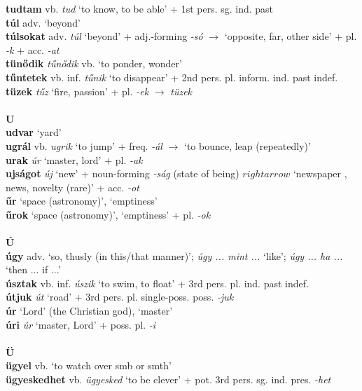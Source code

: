 \documentclass[11pt]{article}
\begin{document}
\textbf{tudtam} vb. \emph{tud} `to know, to be able' + 1st
pers. sg. ind. past \\
\textbf{túl} adv. `beyond' \\
\textbf{túlsokat} adv. \emph{túl} `beyond' + adj.\hyp{}forming \emph{-só}
$\rightarrow$ `opposite, far, other side' + pl. \emph{-k} + acc. \emph{-at} \\
\textbf{tünődik} \emph{tűnődik} vb. `to ponder, wonder' \\
\textbf{tűntetek} vb. inf. \emph{tűnik} `to disappear' + 2nd
pers. pl. inform. ind. past indef. \\
\textbf{tüzek} \emph{tűz} `fire, passion' + pl. \emph{-ek}
$\rightarrow$ \emph{tüzek} \\
\ \\
\noindent \textbf{\large U} \\
\textbf{udvar} `yard' \\
\textbf{ugrál} vb. \emph{ugrik} `to jump' + freq. \emph{-ál}
$\rightarrow$ `to bounce, leap (repeatedly)' \\
\textbf{urak} \emph{úr} `master, lord' + pl. \emph{-ak} \\
\textbf{ujságot} \emph{új} `new' + noun\hyp{}forming \emph{-ság}
(state of being)
$rightarrow$ `newspaper , news, novelty (rare)' + acc. \emph{-ot} \\
\textbf{űr} `space (astronomy)', `emptiness' \\
\textbf{űrok} `space (astronomy)', `emptiness' + pl. \emph{-ok} \\
\ \\
\noindent \textbf{\large Ú} \\
\textbf{úgy} adv. `so, thusly (in this/that manner)'; \emph{úgy
... mint ...} `like'; \emph{úgy ... ha ...} `then ... if ...' \\
\textbf{úsztak} vb. inf. \emph{úszik} `to swim, to float' + 3rd
pers. pl. ind. past indef. \\
\textbf{útjuk} \emph{út} `road' + 3rd
pers. pl. single\hyp{}poss. poss. \emph{-juk} \\
\textbf{úr} `Lord' (the Christian god), `master' \\
\textbf{úri} \emph{úr} `master, Lord' + poss. pl. \emph{-i} \\
\ \\
\noindent \textbf{\large Ü} \\
\textbf{ügyel} vb. `to watch over smb or smth' \\
\textbf{ügyeskedhet} vb. \emph{ügyesked} `to be clever' +
  pot. 3rd pers. sg. ind. pres. \emph{-het} \\
\end{document}
